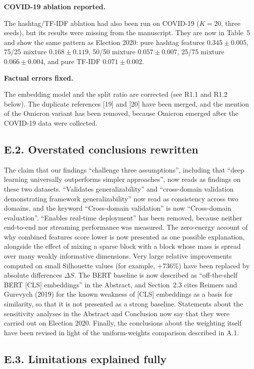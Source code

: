 \documentclass[11pt,a4paper]{article}
\newcommand{\parthead}[1]{\par\medskip\textbf{#1}\par}
\begin{document}
\parthead{COVID-19 ablation reported.}
The hashtag/TF-IDF ablation had also been run on COVID-19 ($K = 20$, three seeds), but its results were missing from the manuscript. They are now in Table~5 and show the same pattern as Election 2020: pure hashtag features $0.345 \pm 0.005$, 75/25 mixture $0.168 \pm 0.119$, 50/50 mixture $0.057 \pm 0.007$, 25/75 mixture $0.066 \pm 0.004$, and pure TF-IDF $0.071 \pm 0.002$.

\parthead{Factual errors fixed.}
The embedding model and the split ratio are corrected (see R1.1 and R1.2 below). The duplicate references [19] and [20] have been merged, and the mention of the Omicron variant has been removed, because Omicron emerged after the COVID-19 data were collected.

\subsection{E.2. Overstated conclusions rewritten}

The claim that our findings ``challenge three assumptions'', including that ``deep learning universally outperforms simpler approaches'', now reads as findings on these two datasets. ``Validates generalizability'' and ``cross-domain validation demonstrating framework generalizability'' now read as consistency across two domains, and the keyword ``Cross-domain validation'' is now ``Cross-domain evaluation''. ``Enables real-time deployment'' has been removed, because neither end-to-end nor streaming performance was measured. The zero-energy account of why combined features score lower is now presented as one possible explanation, alongside the effect of mixing a sparse block with a block whose mass is spread over many weakly informative dimensions. Very large relative improvements computed on small Silhouette values (for example, +736\%) have been replaced by absolute differences $\Delta S$. The BERT baseline is now described as ``off-the-shelf BERT [CLS] embeddings'' in the Abstract, and Section~2.3 cites Reimers and Gurevych (2019) for the known weakness of [CLS] embeddings as a basis for similarity, so that it is not presented as a strong baseline. Statements about the sensitivity analyses in the Abstract and Conclusion now say that they were carried out on Election 2020. Finally, the conclusions about the weighting itself have been revised in light of the uniform-weights comparison described in A.1.

\subsection{E.3. Limitations explained fully}
\end{document}
